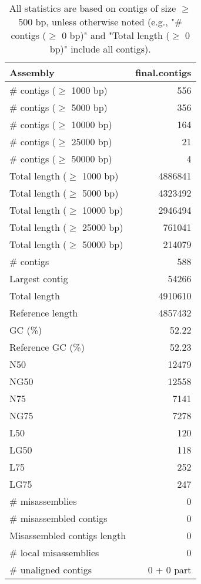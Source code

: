 \documentclass[12pt,a4paper]{article}
\begin{document}
\begin{table}[ht]
\begin{center}
\caption{All statistics are based on contigs of size $\geq$ 500 bp, unless otherwise noted (e.g., "\# contigs ($\geq$ 0 bp)" and "Total length ($\geq$ 0 bp)" include all contigs).}
\begin{tabular}{|l*{1}{|r}|}
\hline
Assembly & final.contigs \\ \hline
\# contigs ($\geq$ 1000 bp) & 556 \\ \hline
\# contigs ($\geq$ 5000 bp) & 356 \\ \hline
\# contigs ($\geq$ 10000 bp) & 164 \\ \hline
\# contigs ($\geq$ 25000 bp) & 21 \\ \hline
\# contigs ($\geq$ 50000 bp) & 4 \\ \hline
Total length ($\geq$ 1000 bp) & 4886841 \\ \hline
Total length ($\geq$ 5000 bp) & 4323492 \\ \hline
Total length ($\geq$ 10000 bp) & 2946494 \\ \hline
Total length ($\geq$ 25000 bp) & 761041 \\ \hline
Total length ($\geq$ 50000 bp) & 214079 \\ \hline
\# contigs & 588 \\ \hline
Largest contig & 54266 \\ \hline
Total length & 4910610 \\ \hline
Reference length & 4857432 \\ \hline
GC (\%) & 52.22 \\ \hline
Reference GC (\%) & 52.23 \\ \hline
N50 & 12479 \\ \hline
NG50 & 12558 \\ \hline
N75 & 7141 \\ \hline
NG75 & 7278 \\ \hline
L50 & 120 \\ \hline
LG50 & 118 \\ \hline
L75 & 252 \\ \hline
LG75 & 247 \\ \hline
\# misassemblies & 0 \\ \hline
\# misassembled contigs & 0 \\ \hline
Misassembled contigs length & 0 \\ \hline
\# local misassemblies & 0 \\ \hline
\# unaligned contigs & 0 + 0 part \\ \hline

\end{tabular}
\end{center}
\end{table}
\end{document}
